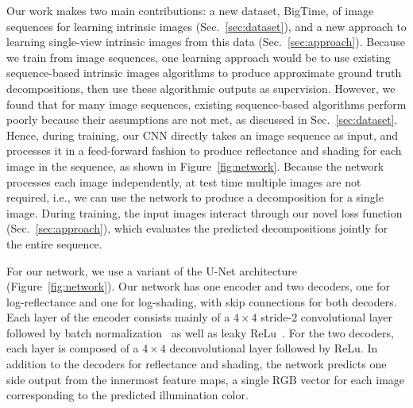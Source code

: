 \documentclass[10pt,twocolumn,letterpaper]{article}
\newcommand{\zhengqi}[1]{{\textcolor{blue}{[\emph{Zhengqi says}: #1]}}}\newcommand{\noah}[1]{{\textcolor{orange}{[\emph{Noah says}: #1]}}}\newcommand{\BT}{{\sc BigTime}\xspace}\newcommand{\BTShort}{{\sc BT}\xspace}\newcommand{\Images}{\mathcal{I}}\newcommand{\Reflectances}{\mathcal{R}}\newcommand{\Shadings}{\mathcal{S}}\newcommand{\Energy}{\mathcal{E}}\newcommand{\Mask}{M}\newcommand{\acronym}{APWLS\xspace}%
\begin{document}
Our work makes two main contributions: a new dataset, \BT, of image
sequences for learning intrinsic images
(Sec.~\ref{sec:dataset}), and a new
approach to learning single-view intrinsic images from this data
(Sec.~\ref{sec:approach}).  Because we train from image sequences,
one learning approach would be to use existing sequence-based
intrinsic images algorithms to produce approximate ground truth
decompositions,
then use these algorithmic outputs as supervision. However, we found
that for many image sequences, existing sequence-based algorithms
perform poorly because their assumptions are not met, as discussed in
Sec.~\ref{sec:dataset}. Hence, during training, our CNN directly takes
an image sequence as input, and processes it in a feed-forward fashion
to produce reflectance and shading for each image in the sequence, as
shown in Figure~\ref{fig:network}. Because the network processes each
image independently, at test time multiple images are not required,
i.e., we can use the network to produce a decomposition for a single
image.
During training, the input images interact through our novel loss
function (Sec.~\ref{sec:approach}), which evaluates the predicted
decompositions jointly for the entire sequence. 

For our network, we use a variant of the U-Net
architecture~\cite{ronneberger2015u, isola2016image}
(Figure~\ref{fig:network}). Our network has one encoder and two
decoders, one for log-reflectance and one for log-shading, with skip
connections for both decoders.
Each layer of the encoder consists mainly of a $4\times 4$ stride-2
convolutional layer followed by batch
normalization~\cite{ioffe2015batch} as well as leaky
ReLu~\cite{he2015delving}. For the two decoders, each layer is
composed of a $4\times 4$ deconvolutional layer followed by ReLu.
In addition to the decoders for reflectance and shading, the network
predicts one side output from the innermost feature maps, a single RGB
vector for each image corresponding to the predicted illumination
color.
\end{document}
